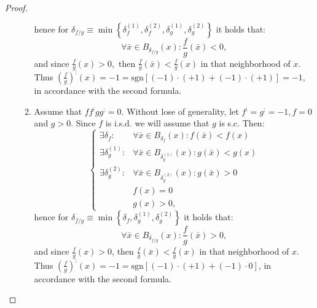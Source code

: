 \documentclass[11pt]{book}
\begin{document}
\begin{proof}
\begin{enumerate}
\begin{enumerate}
hence for $\delta_{f/g}\equiv\min\left\{ \delta_{f}^{\left(1\right)},\delta_{f}^{\left(2\right)},\delta_{g}^{\left(1\right)},\delta_{g}^{\left(2\right)}\right\}$ it holds that:
$$\forall\bar{x}\in B_{\delta_{f/g}}\left(x\right):\frac{f}{g}\left(\bar{x}\right)<0,$$
and since $\frac{f}{g}\left(x\right)>0,$ then $\frac{f}{g}\left(\bar{x}\right)<\frac{f}{g}\left(x\right)$ in that neighborhood of $x$. Thus $\left(\frac{f}{g}\right)^{;}\left(x\right)=-1=\text{sgn}\left[\left(-1\right)\cdot\left(+1\right)+\left(-1\right)\cdot\left(+1\right)\right]=-1$, in accordance with the second formula.
\item Assume that $ff^{;}gg^{;}=0$. Without lose of generality, let $f^{;}=g^{;}=-1,f=0$ and $g>0$. Since $f$ is i.s.d. we will assume that $g$ is s.c. Then: $$\begin{cases}\exists\delta_{f}: & \forall\bar{x}\in B_{\delta_{f}}\left(x\right):f\left(\bar{x}\right)< f\left(x\right)\\\exists\delta_{g}^{\left(1\right)}: & \forall\bar{x}\in B_{\delta_{g}^{\left(1\right)}}\left(x\right):g\left(\bar{x}\right)< g\left(x\right)\\ \exists\delta_{g}^{\left(2\right)}: & \forall\bar{x}\in B_{\delta_{g}^{\left(2\right)}}\left(x\right):g\left(\bar{x}\right)>0\\& f\left(x\right)=0\\& g\left(x\right)>0,\end{cases}$$
hence for $\delta_{f/g}\equiv\min\left\{ \delta_{f},\delta_{g}^{\left(1\right)},\delta_{g}^{\left(2\right)}\right\}$ it holds that:
$$\forall\bar{x}\in B_{\delta_{f/g}}\left(x\right):\frac{f}{g}\left(\bar{x}\right)>0,$$
and since $\frac{f}{g}\left(x\right)>0$, then $\frac{f}{g}\left(\bar{x}\right)<\frac{f}{g}\left(x\right)$ in that neighborhood of $x$. Thus $\left(\frac{f}{g}\right)^{;}\left(x\right)=-1=\text{sgn}\left[\left(-1\right)\cdot\left(+1\right)+\left(-1\right)\cdot0\right]$, in accordance with the second formula.
\end{enumerate}


\end{enumerate}
\end{proof}
\end{document}
